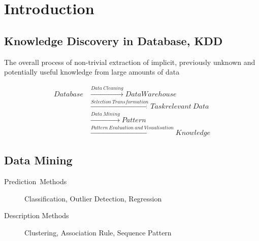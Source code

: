 \chapter{Introduction}

\section{Knowledge Discovery in Database, KDD}

The overall process of non-trivial extraction of implicit, previously unknown and potentially useful knowledge from large amounts of data

\begin{align*}
    Database &\xrightarrow{Data\ Cleaning} Data Warehouse \\ 
    &\xrightarrow{Selection\ Transformation} Task relevant\ Data \\
    &\xrightarrow{Data\ Mining} Pattern \\
    &\xrightarrow{Pattern\ Evaluation\ and\ Visualisation} Knowledge
\end{align*}

\section{Data Mining}

\begin{description}
  \item[Prediction\ Methods] Classification, Outlier Detection, Regression
  \item[Description Methods] Clustering, Association Rule, Sequence Pattern
\end{description}